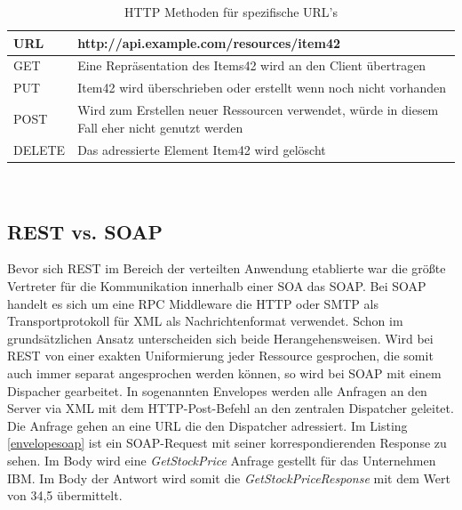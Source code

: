 \documentclass[fleqn,10pt,ngerman]{SelfArx}
\begin{document}
\begin{table}[hbt]
	\caption{HTTP Methoden für spezifische URL's}
	\centering
	\begin{tabular}{ |p{2cm}|p{6cm}|}
		\toprule
		\cmidrule(r){1-2}
		URL & \textbf{http://api.example.com/resources/item42}\\
		\midrule
		GET & Eine Repräsentation des Items42 wird an den Client übertragen\\
		\midrule
		PUT & Item42 wird überschrieben oder erstellt wenn noch nicht vorhanden\\
		\midrule
		POST & Wird zum Erstellen neuer Ressourcen verwendet, würde in diesem Fall eher nicht genutzt werden\\
		\midrule
		DELETE & Das adressierte Element Item42 wird gelöscht\\
		\bottomrule
	\end{tabular}\\
	\label{tab:httptable}
\end{table}

\subsection{REST vs. SOAP}
Bevor sich REST im Bereich der verteilten Anwendung etablierte war die größte Vertreter für die Kommunikation innerhalb einer SOA das SOAP. Bei SOAP handelt es sich um eine RPC Middleware die HTTP oder SMTP als Transportprotokoll für XML als Nachrichtenformat verwendet. Schon im grundsätzlichen Ansatz unterscheiden sich beide Herangehensweisen. Wird bei REST von einer exakten Uniformierung jeder Ressource gesprochen, die somit auch immer separat angesprochen werden können, so wird bei SOAP mit einem Dispacher gearbeitet. In sogenannten Envelopes werden alle Anfragen an den Server via XML mit dem HTTP-Post-Befehl an den zentralen Dispatcher geleitet. Die Anfrage gehen an eine URL die den Dispatcher adressiert. Im Listing \ref{envelopesoap} ist ein SOAP-Request mit seiner korrespondierenden Response zu sehen. Im Body wird eine \textit{GetStockPrice} Anfrage gestellt für das Unternehmen IBM. Im Body der Antwort wird somit die \textit{GetStockPriceResponse} mit dem Wert von 34,5 übermittelt. 
\end{document}
